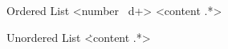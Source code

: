 \begin{identifier}{Ordered List}
<number ~d+> <content .*>
\end{identifier}
\begin{identifier}{Unordered List}
\. <content .*>
\end{identifier}

